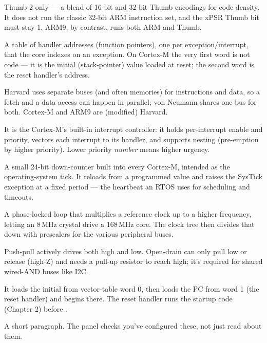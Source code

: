Thumb-2 only --- a blend of 16-bit and 32-bit Thumb encodings for code
density. It does not run the classic 32-bit ARM instruction set, and the xPSR
Thumb bit must stay 1. ARM9, by contrast, runs both ARM and Thumb.

A table of handler addresses (function pointers), one per exception/interrupt,
that the core indexes on an exception. On Cortex-M the very first word is not
code --- it is the initial  (stack-pointer) value loaded at reset;
the second word is the reset handler's address.

Harvard uses separate buses (and often memories) for instructions and data, so
a fetch and a data access can happen in parallel; von Neumann shares one bus
for both. Cortex-M and ARM9 are (modified) Harvard.

It is the Cortex-M's built-in interrupt controller: it holds per-interrupt
enable and priority, vectors each interrupt to its handler, and supports
nesting (pre-emption by higher priority). Lower priority \emph{number} means
higher urgency.

A small 24-bit down-counter built into every Cortex-M, intended as the
operating-system tick. It reloads from a programmed value and raises the
SysTick exception at a fixed period --- the heartbeat an RTOS uses for
scheduling and timeouts.

A phase-locked loop that multiplies a reference clock up to a higher
frequency, letting an 8\,MHz crystal drive a 168\,MHz core. The clock tree then
divides that down with prescalers for the various peripheral buses.

Push-pull actively drives both high and low. Open-drain can only pull low or
release (high-Z) and needs a pull-up resistor to reach high; it's required for
shared wired-AND buses like I2C.

It loads the initial  from vector-table word 0, then loads the PC
from word 1 (the reset handler) and begins there. The reset handler runs the
startup code (Chapter 2) before .

%
{A short paragraph. The panel checks you've configured these, not just read
about them.}

